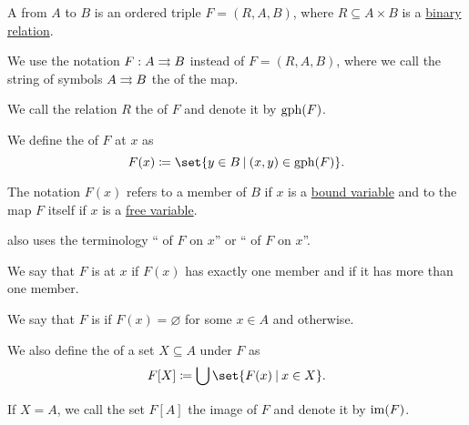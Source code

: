 \begin{definition}\label{def:set_valued_map}
  A  from \( A \) to \( B \) is an ordered triple \( F = (R, A, B) \), where \( R \subseteq A \times B \) is a \hyperref[def:binary_relation]{binary relation}.

  We use the notation \( F: A \rightrightarrows B \) instead of \( F = (R, A, B) \), where we call the string of symbols \( A \rightrightarrows B \) the  of the map.

  \begin{thmenum}[series=def:set_valued_map]
     We call the relation \( R \) the  of \( F \) and denote it by \( \operatorname{gph}(F) \).

     We define the  of \( F \) at \( x \) as
    \begin{equation*}
      F(x) \coloneqq \set{ y \in B \given (x, y) \in \gph(F) }.
    \end{equation*}

    The notation \( F(x) \) refers to a member of \( B \) if \( x \) is a \hyperref[def:first_order_syntax/formula_bound_variables]{bound variable} and to the map \( F \) itself if \( x \) is a \hyperref[def:first_order_syntax/formula_free_variables]{free variable}.

     also uses the terminology \enquote{ of \( F \) on \( x \)} or \enquote{ of \( F \) on \( x \)}.

    We say that \( F \) is  at \( x \) if \( F(x) \) has exactly one member and  if it has more than one member.

     We say that \( F \) is  if \( F(x) = \varnothing \) for some \( x \in A \) and  otherwise.

     We also define the  of a set \( X \subseteq A \) under \( F \) as
    \begin{equation*}
      F[X] \coloneqq \bigcup \set{ F(x) \given x \in X }.
    \end{equation*}

    If \( X = A \), we call the set \( F[A] \) the image of \( F \) and denote it by \( \operatorname{im}(F) \).


\end{thmenum}
\end{definition}
